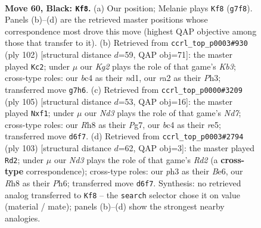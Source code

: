 \documentclass[11pt]{article}
\begin{document}
\clearpage

\begin{figure}[p]\centering
\begin{subfigure}{0.46\textwidth}\centering
\resizebox{\linewidth}{!}{%
\newchessgame
\chessboard[
  setfen={7r/p3R1kp/P2n4/2r5/2B5/1Pp3KP/R1P3P1/8 b - - 1 60},
  showmover=false,
  pgfstyle=straightmove, color=movearrow, markmove={g7-f8}
]}
\caption{}
\end{subfigure}\hfill
\begin{subfigure}{0.46\textwidth}\centering
\resizebox{\linewidth}{!}{%
\newchessgame
\chessboard[
  setfen={8/5p2/4p1kp/2P3p1/RP2Pb2/1K1r1P1P/8/1R1n4 w - - 7 52},
  showmover=false,
  pgfstyle=straightmove, color=movearrow, markmove={b3-c2}
]}
\caption{}
\end{subfigure}
\\[4pt]
\begin{subfigure}{0.46\textwidth}\centering
\resizebox{\linewidth}{!}{%
\newchessgame
\chessboard[
  setfen={8/5ppk/8/4R2p/7P/4P1P1/3n1PK1/2r2B2 b - - 2 53},
  showmover=false,
  pgfstyle=straightmove, color=movearrow, markmove={d2-f1}
]}
\caption{}
\end{subfigure}\hfill
\begin{subfigure}{0.46\textwidth}\centering
\resizebox{\linewidth}{!}{%
\newchessgame
\chessboard[
  setfen={1r6/3r3k/1B2b2p/p1P5/P7/1PN3P1/4P2K/4R3 b - - 0 52},
  showmover=false,
  pgfstyle=straightmove, color=movearrow, markmove={d7-d2}
]}
\caption{}
\end{subfigure}
\caption{\textbf{Move 60, Black: \texttt{Kf8}.} (a) Our position; Melanie plays \texttt{Kf8} (\texttt{g7f8}). Panels (b)--(d) are the retrieved master positions whose correspondence most drove this move (highest QAP objective among those that transfer to it). (b) Retrieved from \texttt{ccrl\_top\_p0003\#930} (ply 102) [structural distance $d$=59, QAP obj=71]: the master played \texttt{Kc2}; under $\mu$ our \emph{Kg2} plays the role of that game's \emph{Kb3}; cross-type roles: our \emph{b}c4 as their \emph{n}d1, our \emph{r}a2 as their \emph{P}h3; transferred move \texttt{g7h6}. (c) Retrieved from \texttt{ccrl\_top\_p0000\#3209} (ply 105) [structural distance $d$=53, QAP obj=16]: the master played \texttt{Nxf1}; under $\mu$ our \emph{Nd3} plays the role of that game's \emph{Nd7}; cross-type roles: our \emph{R}h8 as their \emph{P}g7, our \emph{b}c4 as their \emph{r}e5; transferred move \texttt{d6f7}. (d) Retrieved from \texttt{ccrl\_top\_p0003\#2794} (ply 103) [structural distance $d$=62, QAP obj=3]: the master played \texttt{Rd2}; under $\mu$ our \emph{Nd3} plays the role of that game's \emph{Rd2} (a \textbf{cross-type} correspondence); cross-type roles: our \emph{p}h3 as their \emph{B}e6, our \emph{R}h8 as their \emph{P}h6; transferred move \texttt{d6f7}. Synthesis: no retrieved analog transferred to \texttt{Kf8} -- the \texttt{search} selector chose it on value (material / mate); panels (b)--(d) show the strongest nearby analogies.}
\label{fig:thought-m119}
\end{figure}
\end{document}
